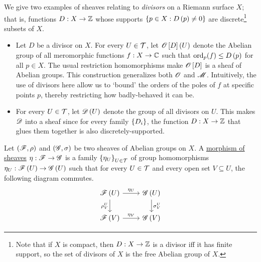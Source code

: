 \documentclass[../Moduli_Spaces_of_Riemann_Surfaces.tex]{subfiles}
\begin{document}
    \begin{example}
        We give two examples of sheaves relating to \textit{divisors} on a Riemann surface $X$; that is, functions $D:X\to\mathbb{Z}$ whose supports $\left\{p\in X: D\left(p\right)\neq0\right\}$ are discrete\footnote{Note that if $X$ is compact, then $D:X\to\mathbb{Z}$ is a divisor iff it has finite support, so the set of divisors of $X$ is the free Abelian group of $X$.} subsets of $X$.
        \begin{itemize}
            \item Let $D$ be a divisor on $X$. For every $U\in\mathcal{T}$, let $\mathscr{O}\left[D\right]\left(U\right)$ denote the Abelian group of all meromorphic functions $f:X\to\mathbb{C}$ such that $\operatorname{ord}_p\!\left(f\right)\leq D\left(p\right)$ for all $p\in X$. The usual restriction homomorphisms make $\mathscr{O}\left[D\right]$ is a sheaf of Abelian groups. This construction generalizes both $\mathscr{O}$ and $\mathscr{M}$. Intuitively, the use of divisors here allow us to `bound' the orders of the poles of $f$ at specific points $p$, thereby restricting how badly-behaved it can be.
            \item For every $U\in\mathcal{T}$, let $\mathscr{D}\left(U\right)$ denote the group of all divisors on $U$. This makes $\mathscr{D}$ into a sheaf since for every family $\left\{D_i\right\}$, the function $D:X\to\mathbb{Z}$ that glues them together is also discretely-supported.\exqed
        \end{itemize}
    \end{example}
    \begin{definition}
        Let $\left(\mathscr{F},\rho\right)$ and $\left(\mathscr{G},\sigma\right)$ be two sheaves of Abelian groups on $X$. A \ul{morphism of sheaves} $\eta:\mathscr{F}\to\mathscr{G}$ is a family $\left\{\eta_U\right\}_{U\in\mathcal{T}}$ of group homomorphisms $\eta_U:\mathscr{F}\left(U\right)\to\mathscr{G}\left(U\right)$ such that for every $U\in\mathcal{T}$ and every open set $V\subseteq U$, the following diagram commutes.
        \begin{equation*}
            \begin{tikzcd}
                \ms{F}\l(U\r) \ar[r, "\eta_U"] \ar[d, "\rho^U_V"'] & \ms{G}\l(U\r) \ar[d, "\sigma^U_V"] \\
                \ms{F}\l(V\r) \ar[r, "\eta_V"] & \ms{G}\l(V\r)
            \end{tikzcd}
        \end{equation*}
    \end{definition}
\end{document}
